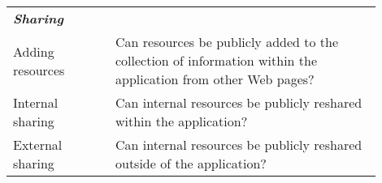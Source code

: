 \begin{table*}[htbp]
\begin{tabular}{|p{0.25\linewidth}|p{0.65\linewidth}|}
\emph{\textbf{Sharing}}            &                                                                                                           \\
Adding resources             & Can resources be publicly added to the collection of information within the application from other Web pages?     \\
Internal sharing         & Can internal resources be publicly reshared within the application?         \\ 
External sharing          & Can internal resources be publicly reshared outside of the application?         \\ 
         
\hline
\end{tabular}
\end{table*}





